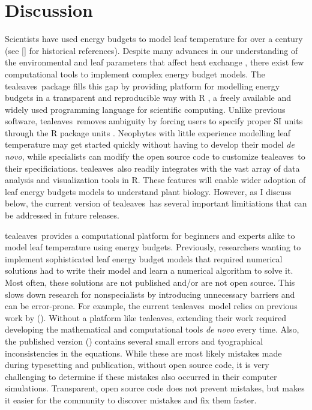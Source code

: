 \documentclass[11pt, oneside]{article}
\newcommand{\pkg}[1]{{\fontseries{b}\selectfont #1}}
\newcommand{\tealeaves}{\pkg{tealeaves}}
\begin{document}
\section*{Discussion}

Scientists have used energy budgets to model leaf temperature for over a century (see \citeauthor{Raschke_1960} [\citeyear{Raschke_1960}] for historical references). Despite many advances in our understanding of the environmental and leaf parameters that affect heat exchange \citep{Gutschick_2016}, there exist few computational tools to implement complex energy budget models. The \tealeaves~package fills this gap by providing platform for modelling energy budgets in a transparent and reproducible way with R \citep{R_2018}, a freely available and widely used programming language for scientific computing. Unlike previous software, \tealeaves~removes ambiguity by forcing users to specify proper SI units through the R package \pkg{units} \citep{Pebesma_etal_2016}. Neophytes with little experience modelling leaf temperature may get started quickly without having to develop their model \textit{de novo}, while specialists can modify the open source code to customize \tealeaves~to their specificiations. \tealeaves~also readily integrates with the vast array of data analysis and visualization tools in R. These features will enable wider adoption of leaf energy budgets models to understand plant biology. However, as I discuss below, the current version of \tealeaves~has several important limitiations that can be addressed in future releases.

\tealeaves~provides a computational platform for beginners and experts alike to model leaf temperature using energy budgets. Previously, researchers wanting to implement sophisticated leaf energy budget models that required numerical solutions had to write their model and learn a numerical algorithm to solve it. Most often, these solutions are not published and/or are not open source. This slows down research for nonspecialists by introducing unnecessary barriers and can be error-prone. For example, the current \tealeaves~model relies on previous work by \citeauthor{Foster_Smith_1986} (\citeyear{Foster_Smith_1986}). Without a platform like \tealeaves, extending their work required developing the mathematical and computational tools \textit{de novo} every time. Also, the published version \citeauthor{Foster_Smith_1986} (\citeyear{Foster_Smith_1986}) contains several small errors and tyographical inconsistencies in the equations. While these are most likely mistakes made during typesetting and publication, without open source code, it is very challenging to determine if these mistakes also occurred in their computer simulations. Transparent, open source code does not prevent mistakes, but makes it easier for the community to discover mistakes and fix them faster. 
\end{document}
